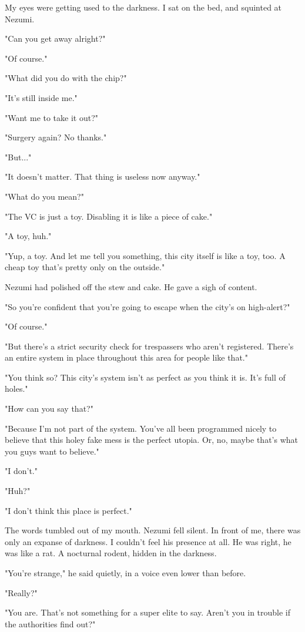 My eyes were getting used to the darkness. I sat on the bed, and
squinted at Nezumi.

"Can you get away alright?"

"Of course."

"What did you do with the chip?"

"It's still inside me."

"Want me to take it out?"

"Surgery again? No thanks."

"But..."

"It doesn't matter. That thing is useless now anyway."

"What do you mean?"

"The VC is just a toy. Disabling it is like a piece of cake."

"A toy, huh."

"Yup, a toy. And let me tell you something, this city itself is like a
toy, too. A cheap toy that's pretty only on the outside."

Nezumi had polished off the stew and cake. He gave a sigh of content.

"So you're confident that you're going to escape when the city's on
high-alert?"

"Of course."

"But there's a strict security check for trespassers who aren't
registered. There's an entire system in place throughout this area for
people like that."

"You think so? This city's system isn't as perfect as you think it is.
It's full of holes."

"How can you say that?"

"Because I'm not part of the system. You've all been programmed nicely
to believe that this holey fake mess is the perfect utopia. Or, no,
maybe that's what you guys want to believe."

"I don't."

"Huh?"

"I don't think this place is perfect."

The words tumbled out of my mouth. Nezumi fell silent. In front of me,
there was only an expanse of darkness. I couldn't feel his presence at
all. He was right, he was like a rat. A nocturnal rodent, hidden in the
darkness.

"You're strange," he said quietly, in a voice even lower than before.

"Really?"

"You are. That's not something for a super elite to say. Aren't you in
trouble if the authorities find out?"

